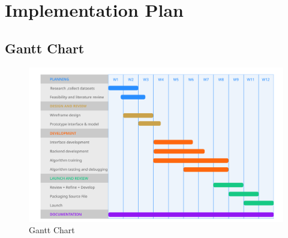 \chapter{Implementation Plan}
\section{Gantt Chart}
\begin{figure}[H]
        \includegraphics[width=150mm, left]{./img/gantt_chart.png}
\caption{Gantt Chart}
\end{figure}
\clearpage
